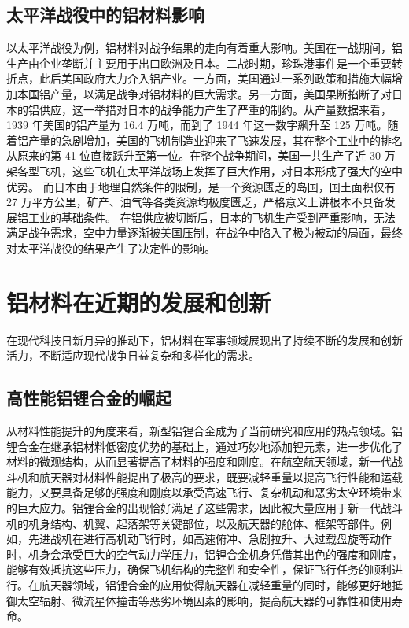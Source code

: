 \documentclass{source/Paper}
\begin{document}
\subsection{太平洋战役中的铝材料影响}
以太平洋战役为例，铝材料对战争结果的走向有着重大影响。美国在一战期间，铝生产由企业垄断并主要用于出口欧洲及日本。二战时期，珍珠港事件是一个重要转折点，此后美国政府大力介入铝产业。一方面，美国通过一系列政策和措施大幅增加本国铝产量，以满足战争对铝材料的巨大需求。另一方面，美国果断掐断了对日本的铝供应，这一举措对日本的战争能力产生了严重的制约。从产量数据来看，1939 年美国的铝产量为 16.4 万吨，而到了 1944 年这一数字飙升至 125 万吨。随着铝产量的急剧增加，美国的飞机制造业迎来了飞速发展，其在整个工业中的排名从原来的第 41 位直接跃升至第一位。在整个战争期间，美国一共生产了近 30 万架各型飞机，这些飞机在太平洋战场上发挥了巨大作用，对日本形成了强大的空中优势。
\cite{bilibili}而日本由于地理自然条件的限制，是一个资源匮乏的岛国，国土面积仅有 27 万平方公里，矿产、油气等各类资源均极度匮乏，严格意义上讲根本不具备发展铝工业的基础条件。
\cite{nihon}在铝供应被切断后，日本的飞机生产受到严重影响，无法满足战争需求，空中力量逐渐被美国压制，在战争中陷入了极为被动的局面，最终对太平洋战役的结果产生了决定性的影响。
\section{铝材料在近期的发展和创新}
在现代科技日新月异的推动下，铝材料在军事领域展现出了持续不断的发展和创新活力，不断适应现代战争日益复杂和多样化的需求。
\subsection{高性能铝锂合金的崛起}
从材料性能提升的角度来看，新型铝锂合金成为了当前研究和应用的热点领域。铝锂合金在继承铝材料低密度优势的基础上，通过巧妙地添加锂元素，进一步优化了材料的微观结构，从而显著提高了材料的强度和刚度。在航空航天领域，新一代战斗机和航天器对材料性能提出了极高的要求，既要减轻重量以提高飞行性能和运载能力，又要具备足够的强度和刚度以承受高速飞行、复杂机动和恶劣太空环境带来的巨大应力。铝锂合金的出现恰好满足了这些需求，因此被大量应用于新一代战斗机的机身结构、机翼、起落架等关键部位，以及航天器的舱体、框架等部件。例如，先进战机在进行高机动飞行时，如高速俯冲、急剧拉升、大过载盘旋等动作时，机身会承受巨大的空气动力学压力，铝锂合金机身凭借其出色的强度和刚度，能够有效抵抗这些压力，确保飞机结构的完整性和安全性，保证飞行任务的顺利进行。在航天器领域，铝锂合金的应用使得航天器在减轻重量的同时，能够更好地抵御太空辐射、微流星体撞击等恶劣环境因素的影响，提高航天器的可靠性和使用寿命。
\end{document}
